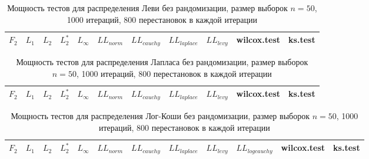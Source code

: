 \documentclass{article}
\begin{document}
\begin{longtable}{|c|c|c|c|c|c|c|c|c|c|c|}
  \caption{Мощность тестов для распределения Леви без рандомизации, размер выборок $n=50$, 1000 итераций, 800 перестановок в каждой итерации}
  \label{table:n50} \\
  \hline
  $F_2$ & $L_{1}$ & $L_{2}$ & $L_2^*$ & $L_{\infty}$ & $LL_{norm}$ & $LL_{cauchy}$ & $LL_{laplace}$ & $LL_{levy}$ & wilcox.test & ks.test \\ \hline
  
\end{longtable}

\newpage

\begin{longtable}{|c|c|c|c|c|c|c|c|c|c|c|}
  \caption{Мощность тестов для распределения Лапласа без рандомизации, размер выборок $n=50$, 1000 итераций, 800 перестановок в каждой итерации}
  \label{table:n50} \\
  \hline
  $F_2$ & $L_{1}$ & $L_{2}$ & $L_2^*$ & $L_{\infty}$ & $LL_{norm}$ & $LL_{cauchy}$ & $LL_{laplace}$ & $LL_{levy}$ & wilcox.test & ks.test \\ \hline
  
\end{longtable}

\begin{longtable}{|c|c|c|c|c|c|c|c|c|c|c|c|}
  \caption{Мощность тестов для распределения Лог-Коши без рандомизации, размер выборок $n=50$, 1000 итераций, 800 перестановок в каждой итерации}
  \label{table:n50} \\
  \hline
  $F_2$ & $L_{1}$ & $L_{2}$ & $L_2^*$ & $L_{\infty}$ & $LL_{norm}$ & $LL_{cauchy}$ & $LL_{laplace}$ & $LL_{levy}$ & $LL_{logcauchy}$ & wilcox.test & ks.test \\ \hline
  
\end{longtable}
\end{document}
